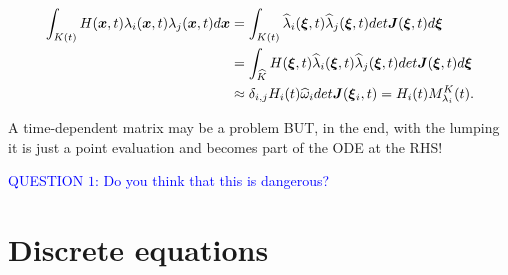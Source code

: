 \documentclass[english]{article}
\theoremstyle{thmstyleone}
\theoremstyle{thmstyletwo}
\theoremstyle{thmstylethree}
\newcommand{\uvec}[2][3]{\boldsymbol{#2\mkern-#1mu}\mkern#1mu}
\newcommand{\hl}{\widehat{\lambda}}
\begin{document}
\begin{align}
\begin{split}
\int_{K(t)}H(\uvec{x},t) \lambda_i(\uvec{x},t)\lambda_j(\uvec{x},t)d\uvec{x}&=\int_{K(t)} \hl_i(\uvec{\xi},t)\hl_j(\uvec{\xi},t) det \uvec{J}(\uvec{\xi},t) d\uvec{\xi}\\
&=\int_{\widehat{K}}H(\uvec{\xi},t) \hl_i(\uvec{\xi},t)\hl_j(\uvec{\xi},t) det \uvec{J}(\uvec{\xi},t) d\uvec{\xi}\\
&\approx \delta_{i,j}H_i(t)\widehat{\omega}_i det \uvec{J}(\uvec{\xi}_i,t)=H_i(t)M_{\lambda_i}^K(t).
\end{split}
\end{align}

A time-dependent matrix may be a problem BUT, in the end, with the lumping it is just a point evaluation and becomes part of the ODE at the RHS!


\textcolor{blue}{QUESTION $1$: Do you think that this is dangerous?}


\section{Discrete equations}
\end{document}
